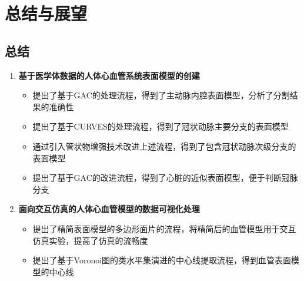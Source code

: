 \section{总结与展望}

\subsection{总结}
\begin{frame}
\begin{enumerate}
\item \textbf{基于医学体数据的人体心血管系统表面模型的创建}
\begin{itemize}
\pause \item 提出了基于GAC的处理流程，得到了主动脉内腔表面模型，分析了分割结果的准确性
\pause \item 提出了基于CURVES的处理流程，得到了冠状动脉主要分支的表面模型
\pause \item 通过引入管状物增强技术改进上述流程，得到了包含冠状动脉次级分支的表面模型
\pause \item 提出了基于GAC的改进流程，得到了心脏的近似表面模型，便于判断冠脉分支
\end{itemize}
\pause \item \textbf{面向交互仿真的人体心血管模型的数据可视化处理}
\begin{itemize}
\pause \item 提出了精简表面模型的多边形面片的流程，将精简后的血管模型用于交互仿真实验，提高了仿真的流畅度
\pause \item 提出了基于Voronoi图的类水平集演进的中心线提取流程，得到血管表面模型的中心线
\end{itemize}
\end{enumerate}
\end{frame}

